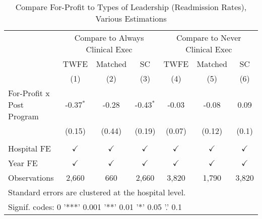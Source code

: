 \begin{table}[ht!]

\caption{\label{tab:forprofit_estimators}Compare For-Profit to Types of Leadership (Readmission Rates), Various Estimations}
\centering
\begin{tabular}[t]{lcccccc}
\toprule
\multicolumn{1}{c}{ } & \multicolumn{3}{c}{Compare to Always Clinical Exec} & \multicolumn{3}{c}{Compare to Never Clinical Exec} \\
\cmidrule(l{3pt}r{3pt}){2-4} \cmidrule(l{3pt}r{3pt}){5-7}
\multicolumn{1}{c}{ } & \multicolumn{1}{c}{TWFE} & \multicolumn{1}{c}{Matched} & \multicolumn{1}{c}{SC} & \multicolumn{1}{c}{TWFE} & \multicolumn{1}{c}{Matched} & \multicolumn{1}{c}{SC} \\
\cmidrule(l{3pt}r{3pt}){2-2} \cmidrule(l{3pt}r{3pt}){3-3} \cmidrule(l{3pt}r{3pt}){4-4} \cmidrule(l{3pt}r{3pt}){5-5} \cmidrule(l{3pt}r{3pt}){6-6} \cmidrule(l{3pt}r{3pt}){7-7}
 & (1) & (2) & (3) & (4) & (5) & (6)\\
\midrule
For-Profit x Post Program & -0.37$^{*}$ & -0.28 & -0.43$^{*}$ & -0.03 & -0.08 & 0.09\\
 & (0.15) & (0.44) & (0.19) & (0.07) & (0.12) & (0.1)\\
 &  &  &  &  &  & \\
Hospital FE & $\checkmark$ & $\checkmark$ & $\checkmark$ & $\checkmark$ & $\checkmark$ & $\checkmark$\\
Year FE & $\checkmark$ & $\checkmark$ & $\checkmark$ & $\checkmark$ & $\checkmark$ & $\checkmark$\\
\addlinespace
Observations & 2,660 & 660 & 2,660 & 3,820 & 1,790 & 3,820\\
\bottomrule
\multicolumn{7}{l}{\textsuperscript{} Standard errors are clustered at the hospital level.}\\
\multicolumn{7}{l}{\textsuperscript{} Signif. codes: 0 '***' 0.001 '**' 0.01 '*' 0.05 '.' 0.1}\\
\end{tabular}
\end{table}
